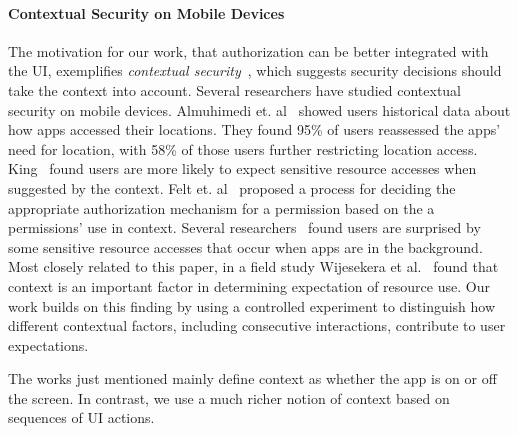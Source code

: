 \paragraph*{Contextual Security on Mobile Devices}
%
%
The motivation for our work, that authorization can be better
integrated with the UI, exemplifies \emph{contextual
  security}~\cite{Nissenbaum:2004}, which suggests security decisions
should take the context into account. Several researchers have
studied contextual security on mobile devices. Almuhimedi
et. al~\cite{Almuhimedi:2015} showed users historical data about how
apps accessed their locations. They found 95\% of users reassessed the
apps' need for location, with 58\% of those users further restricting
location access.  King~\cite{King:2012} found users
are more likely to expect sensitive resource accesses when
suggested by the context. Felt et. 
al~\cite{Felt:2012hotsec} proposed a process for deciding the 
appropriate authorization mechanism for a permission based on the a
permissions' use in context. Several
researchers~\cite{Balebako:2013,Fu:2014,Wijesekera:2015} found users
are surprised by some sensitive resource accesses
that occur when apps are in the
background. Most closely related to this paper, in a field study 
Wijesekera et al.~\cite{Wijesekera:2015} found that context is an
important factor in determining expectation of resource use.
Our work builds on this finding by using a controlled experiment 
to distinguish how different contextual factors, including consecutive 
interactions, contribute to user expectations.

The works just mentioned mainly define context as whether the
app is on or off the screen. In contrast, we use a
much richer notion of context based on sequences of UI actions. 




